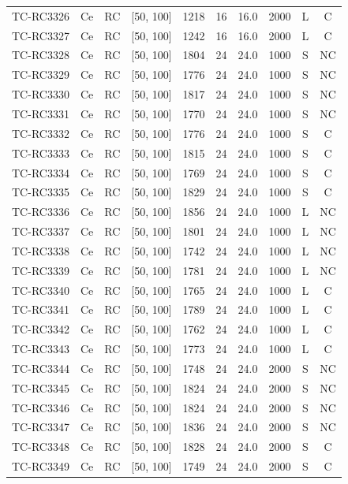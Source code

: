 \begin{longtable}{lccccccccc}
TC-RC3326 & Ce & RC & [50, 100] & 1218 & 16 & 16.0 & 2000 & L & C \\
TC-RC3327 & Ce & RC & [50, 100] & 1242 & 16 & 16.0 & 2000 & L & C \\
TC-RC3328 & Ce & RC & [50, 100] & 1804 & 24 & 24.0 & 1000 & S & NC \\
TC-RC3329 & Ce & RC & [50, 100] & 1776 & 24 & 24.0 & 1000 & S & NC \\
TC-RC3330 & Ce & RC & [50, 100] & 1817 & 24 & 24.0 & 1000 & S & NC \\
TC-RC3331 & Ce & RC & [50, 100] & 1770 & 24 & 24.0 & 1000 & S & NC \\
TC-RC3332 & Ce & RC & [50, 100] & 1776 & 24 & 24.0 & 1000 & S & C \\
TC-RC3333 & Ce & RC & [50, 100] & 1815 & 24 & 24.0 & 1000 & S & C \\
TC-RC3334 & Ce & RC & [50, 100] & 1769 & 24 & 24.0 & 1000 & S & C \\
TC-RC3335 & Ce & RC & [50, 100] & 1829 & 24 & 24.0 & 1000 & S & C \\
TC-RC3336 & Ce & RC & [50, 100] & 1856 & 24 & 24.0 & 1000 & L & NC \\
TC-RC3337 & Ce & RC & [50, 100] & 1801 & 24 & 24.0 & 1000 & L & NC \\
TC-RC3338 & Ce & RC & [50, 100] & 1742 & 24 & 24.0 & 1000 & L & NC \\
TC-RC3339 & Ce & RC & [50, 100] & 1781 & 24 & 24.0 & 1000 & L & NC \\
TC-RC3340 & Ce & RC & [50, 100] & 1765 & 24 & 24.0 & 1000 & L & C \\
TC-RC3341 & Ce & RC & [50, 100] & 1789 & 24 & 24.0 & 1000 & L & C \\
TC-RC3342 & Ce & RC & [50, 100] & 1762 & 24 & 24.0 & 1000 & L & C \\
TC-RC3343 & Ce & RC & [50, 100] & 1773 & 24 & 24.0 & 1000 & L & C \\
TC-RC3344 & Ce & RC & [50, 100] & 1748 & 24 & 24.0 & 2000 & S & NC \\
TC-RC3345 & Ce & RC & [50, 100] & 1824 & 24 & 24.0 & 2000 & S & NC \\
TC-RC3346 & Ce & RC & [50, 100] & 1824 & 24 & 24.0 & 2000 & S & NC \\
TC-RC3347 & Ce & RC & [50, 100] & 1836 & 24 & 24.0 & 2000 & S & NC \\
TC-RC3348 & Ce & RC & [50, 100] & 1828 & 24 & 24.0 & 2000 & S & C \\
TC-RC3349 & Ce & RC & [50, 100] & 1749 & 24 & 24.0 & 2000 & S & C \\

\end{longtable}
